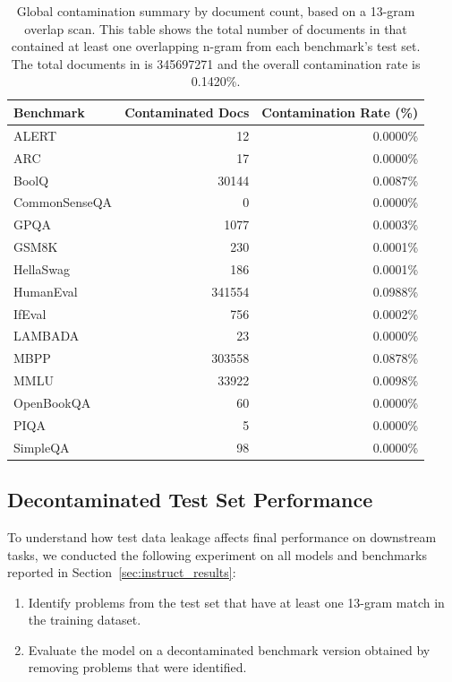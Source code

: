 \begin{table}[htb]
\caption{Global contamination summary by document count, based on a 13-gram overlap scan.
This table shows the total number of documents in \MixtureVitae{} that contained
at least one overlapping n-gram from each benchmark's test set.
The total documents in \MixtureVitae{} is \num{345697271} and the overall contamination rate is 0.1420\%.}
\centering
\begin{tabular}{lrr}
\toprule
Benchmark & {Contaminated Docs} & {Contamination Rate (\%)} \\
\midrule
ALERT         & \num{12}      & 0.0000\% \\
ARC           & \num{17}      & 0.0000\% \\
BoolQ         & \num{30144}   & 0.0087\% \\
CommonSenseQA          & \num{0}    & 0.0000\% \\
GPQA          & \num{1077}    & 0.0003\% \\
GSM8K         & \num{230}     & 0.0001\% \\
HellaSwag     & \num{186}     & 0.0001\% \\
HumanEval     & \num{341554}  & 0.0988\% \\
IfEval        & \num{756}     & 0.0002\% \\
LAMBADA       & \num{23}      & 0.0000\% \\
MBPP          & \num{303558}  & 0.0878\% \\
MMLU          & \num{33922}   & 0.0098\% \\
OpenBookQA    & \num{60}      & 0.0000\% \\
PIQA          & \num{5}       & 0.0000\% \\
SimpleQA      & \num{98}      & 0.0000\% \\
\bottomrule
\end{tabular}

\label{tab:global_contam_summary}
\end{table}

\subsection{Decontaminated Test Set Performance}
\label{app:decontam_gsm8k}
To understand how test data leakage affects final performance on downstream tasks, we conducted the following experiment on all models and benchmarks reported in Section~\ref{sec:instruct_results}:
\begin{enumerate}
    \item Identify problems from the test set that have at least one 13-gram match in the training dataset.
    \item Evaluate the model on a decontaminated benchmark version obtained by removing problems that were identified.
\end{enumerate}

